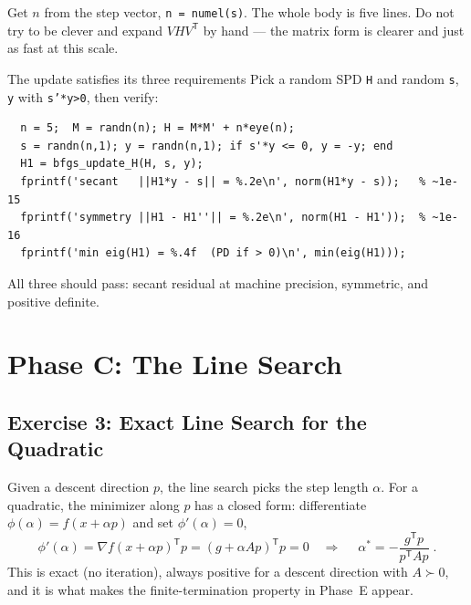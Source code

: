 \documentclass[11pt,letterpaper]{article}
\newcommand{\grad}{\nabla}
\newcommand{\T}{^{\mathsf{T}}}
\begin{document}
\begin{hint}
Get $n$ from the step vector, \texttt{n = numel(s)}. The whole body is five lines.
Do not try to be clever and expand $VHV\T$ by hand --- the matrix form is clearer and
just as fast at this scale.
\end{hint}

\begin{checkpoint}{The update satisfies its three requirements}
Pick a random SPD \texttt{H} and random \texttt{s}, \texttt{y} with \texttt{s'*y>0},
then verify:
\begin{verbatim}
  n = 5;  M = randn(n); H = M*M' + n*eye(n);
  s = randn(n,1); y = randn(n,1); if s'*y <= 0, y = -y; end
  H1 = bfgs_update_H(H, s, y);
  fprintf('secant   ||H1*y - s|| = %.2e\n', norm(H1*y - s));   % ~1e-15
  fprintf('symmetry ||H1 - H1''|| = %.2e\n', norm(H1 - H1'));  % ~1e-16
  fprintf('min eig(H1) = %.4f  (PD if > 0)\n', min(eig(H1)));
\end{verbatim}
All three should pass: secant residual at machine precision, symmetric, and
positive definite.
\end{checkpoint}

\section{Phase C: The Line Search}

\subsection{Exercise 3: Exact Line Search for the Quadratic}

Given a descent direction $p$, the line search picks the step length $\alpha$. For a
quadratic, the minimizer along $p$ has a closed form: differentiate
$\phi(\alpha)=f(x+\alpha p)$ and set $\phi'(\alpha)=0$,
\begin{equation}\label{eq:exactls}
\phi'(\alpha)=\grad f(x+\alpha p)\T p=(g+\alpha A p)\T p=0
\quad\Longrightarrow\quad
\boxed{\;\alpha^\ast=-\frac{g\T p}{p\T A p}\;}.
\end{equation}
This is exact (no iteration), always positive for a descent direction with $A\succ0$,
and it is what makes the finite-termination property in Phase~E appear.
\end{document}
